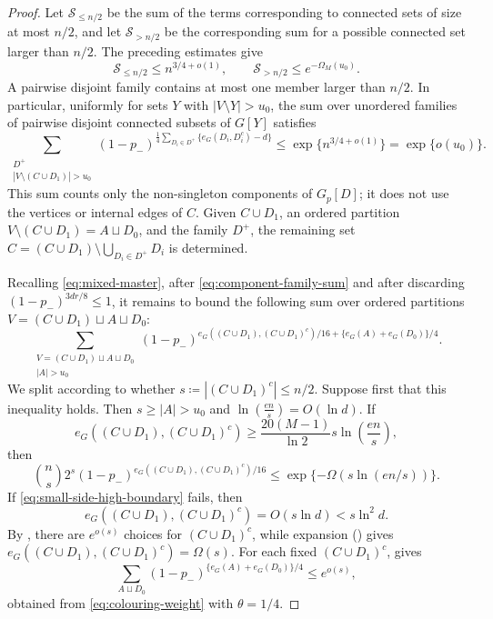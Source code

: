 \documentclass[10pt,a4paper]{article}
\begin{document}
\begin{proof}
Let $\mathcal{S}_{\le n/2}$ be the sum of the terms corresponding to connected sets of size at most $n/2$, and let $\mathcal{S}_{>n/2}$ be the corresponding sum for a possible connected set larger than $n/2$.
The preceding estimates give
\[
 \mathcal{S}_{\le n/2}\le n^{3/4+o(1)},
 \qquad
 \mathcal{S}_{>n/2}\le e^{-\Omega_M(u_0)}.
\]
A pairwise disjoint family contains at most one member larger than $n/2$.
In particular, uniformly for sets $Y$ with $|V\setminus Y|>u_0$, the sum over unordered families of pairwise disjoint connected subsets of $G[Y]$ satisfies
\begin{equation}\label{eq:component-family-sum}
 \sum_{\substack{D^+\\|V\setminus (C \cup D_1)|>u_0}}
 (1-p_-)^{\frac14\sum_{D_i\in D^+}\{e_G(D_i, D_i^c)-d\}}
 \le\exp\{n^{3/4+o(1)}\}
 =\exp\{o(u_0)\}.
\end{equation}
This sum counts only the non-singleton components of $G_p[D]$; it does not use the vertices or internal edges of $C$. Given $C \cup D_1$, an ordered partition $V\setminus (C \cup D_1)=A\sqcup D_0$, and the family $D^+$, the remaining set
$C=(C \cup D_1)\setminus\bigcup_{D_i\in D^+}D_i$ is determined.

Recalling \eqref{eq:mixed-master}, after \eqref{eq:component-family-sum} and after discarding $(1-p_-)^{3dr/8}\le1$, it remains to bound the following sum over ordered partitions $V=(C \cup D_1)\sqcup A\sqcup D_0$:
\begin{equation}\label{eq:ordered-partition-sum}
  \sum_{\substack{V=(C \cup D_1)\sqcup A\sqcup D_0\\
 |A|>u_0}}  (1-p_-)^{e_G((C \cup D_1), (C \cup D_1)^c)/16+\{e_G(A)+e_G(D_0)\}/4}.  
\end{equation}
We split according to whether $s \coloneqq |(C \cup D_1)^c|\le n/2$. Suppose first that this inequality holds. Then $s\ge |A|>u_0$ and $\ln\left(\frac{en}{s}\right)=O(\ln d)$.
If
\begin{equation}\label{eq:small-side-high-boundary}
 e_G((C \cup D_1), (C \cup D_1)^c) \ge \frac{20(M-1)}{\ln 2}s\ln\left(\frac{en}{s}\right),
\end{equation}
then
\[
 \binom ns2^s (1-p_-)^{e_G((C \cup D_1), (C \cup D_1)^c)/16}
 \le \exp\{-\Omega(s\ln(en/s))\}.
\]
If \eqref{eq:small-side-high-boundary} fails, then
\[
 e_G((C \cup D_1), (C \cup D_1)^c)=O(s\ln d)<s\ln^2 d.
\]
By , there are $e^{o(s)}$ choices for $(C \cup D_1)^c$, while expansion () gives $e_G((C \cup D_1), (C \cup D_1)^c)= \Omega(s)$.
For each fixed $(C \cup D_1)^c$,  gives
\[
 \sum_{A\sqcup D_0}  (1-p_-)^{\{e_G(A)+e_G(D_0)\}/4}\le e^{o(s)},
\]
obtained from \eqref{eq:colouring-weight} with $\theta=1/4$.


\end{proof}
\end{document}
